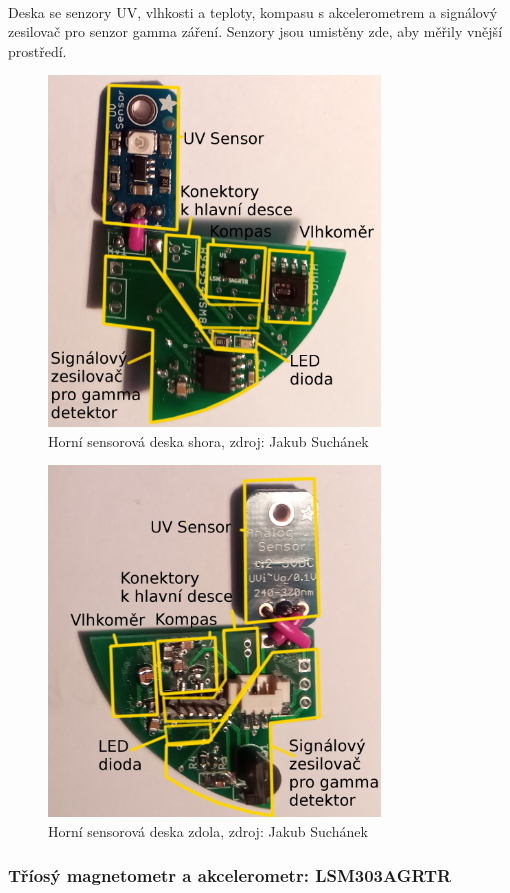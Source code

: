 \documentclass[a4paper]{report}
\begin{document}
\paragraph{} Deska se senzory UV, vlhkosti a teploty, kompasu s akcelerometrem a signálový zesilovač pro senzor gamma záření. Senzory jsou umistěny zde, aby měřily vnější prostředí.
\begin{figure}[H]
\centering
\caption{Horní sensorová deska shora, zdroj: Jakub Suchánek}
\includegraphics[width=250pt]{top1.jpg}
\end{figure}
\begin{figure}[H]
\centering
\caption{Horní sensorová deska zdola, zdroj: Jakub Suchánek}
\includegraphics[width=250pt]{top2.jpg}
\end{figure}
\subsubsection{Tříosý magnetometr a akcelerometr: LSM303AGRTR}
\end{document}
